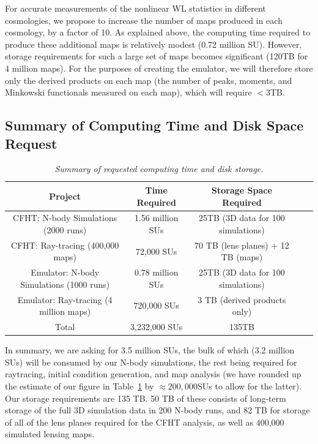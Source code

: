 \documentclass[10pt, preprint]{aastex}
\begin{document}
For accurate measurements of the nonlinear WL statistics in different
cosmologies, we propose to increase the number of maps produced in
each cosmology, by a factor of 10.  As explained above, the computing
time required to produce these additional maps is relatively modest
(0.72 million SU).  However, storage requirements for such a large set
of maps becomes significant (120TB for 4 million maps).  For the
purposes of creating the emulator, we will therefore store only the
derived products on each map (the number of peaks, moments, and
Minkowski functionals measured on each map), which will require $<3$TB.


\subsection{Summary of Computing Time and Disk Space Request}

\begin{table}[t!] \label{tab:summary}
\begin{center}
\begin{tabular}{|c|c|c|c|c|}
\hline
\textbf{Project} & \textbf{Time Required} & \textbf{Storage Space Required}\\ \hline \hline\hline
CFHT: N-body Simulations (2000 runs) & 1.56 million SUs & 25TB (3D data for 100 simulations) \\ \hline 
CFHT: Ray-tracing (400,000 maps)  & 72,000 SUs & 70 TB (lens planes) + 12 TB (maps)\\ \hline
Emulator: N-body Simulations (1000 runs) & 0.78 million SUs & 25TB (3D data for 100 simulations) \\ \hline 
Emulator: Ray-tracing (4 million maps)  & 720,000 SUs & 3 TB (derived products only)\\ \hline\hline\hline
Total & 3,232,000 SUs & 135TB \\ \hline
\end{tabular}
\end{center}
\caption{\textit{Summary of requested computing time and disk storage.}}
\end{table}

In summary, we are asking for 3.5 million SUs, the bulk of which (3.2
million SUs) will be consumed by our N-body simulations, the rest
being required for raytracing, initial condition generation, and map
analysis (we have rounded up the estimate of our figure in
Table~\ref{tab:summary} by $\approx 200,000$SUs to allow for the
latter).  Our storage requirements are 135 TB.  50 TB of these
consists of long-term storage of the full 3D simulation data in 200
N-body runs, and 82 TB for storage of all of the lens planes required
for the CFHT analysis, as well as 400,000 simulated lensing maps.
\end{document}
